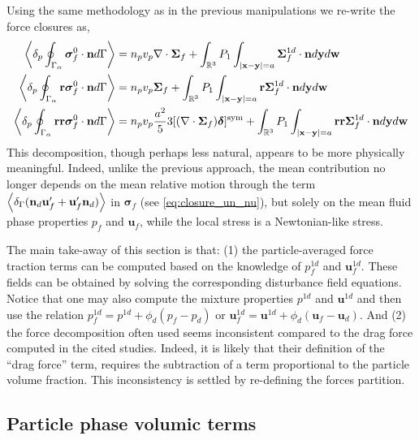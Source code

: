 Using the same methodology as in the previous manipulations we re-write the force closures as, 
\begin{align}
    \pSavg{\bm\sigma_f^0\cdot\textbf{n}}
    &=
    n_p v_p 
    \div\bm\Sigma_f
    +
    \int_{\mathbb{R}^3}
    P_1
    \int_{|\textbf{x}-\textbf{y}|=a}
    \bm\Sigma_f^{1d} \cdot \textbf{n}
    d\textbf{y}d\textbf{w}
    \label{eq:drag_final2}\\
    \pSavg{\textbf{r}\bm\sigma_f^0\cdot\textbf{n}}
    &=
    n_p v_p \bm\Sigma_f
    +
    \int_{\mathbb{R}^3}
    P_1
    \int_{|\textbf{x}-\textbf{y}|=a}
    \textbf{r}\bm\Sigma_f^{1d} \cdot \textbf{n}
    d\textbf{y}
    d\textbf{w}
    \\
    \pSavg{\textbf{rr}\bm\sigma_f^0\cdot\textbf{n}}
    &=
    n_pv_p  \frac{a^2}{5} 3 [(\div \bm\Sigma_f)\bm\delta]^\text{sym}
    +
    \int_{\mathbb{R}^3}
    P_1
    \int_{|\textbf{x}-\textbf{y}|=a}
    \textbf{rr}\bm\Sigma_f^{1d} \cdot \textbf{n}
    d\textbf{y}
    d\textbf{w}
    \label{eq:second_mom_general2}
\end{align}
This decomposition, though perhaps less natural, appears to be more physically meaningful. 
Indeed, unlike the previous approach, the mean contribution no longer depends on the mean relative motion through the term $\left<\delta_\Gamma (\textbf{n}_d \textbf{u}_f'+  \textbf{u}_f' \textbf{n}_d)\right>$ in $\bm\sigma_f$ (see \ref{eq:closure_un_nu}), but solely on the mean fluid phase properties $p_f$ and $\textbf{u}_f$, while the local stress is a Newtonian-like stress.  

The main take-away of this section is that: (1)  the particle-averaged force traction terms can be computed based on the knowledge of $p_f^{1d}$ and $\textbf{u}_f^{1d}$. 
These fields can be obtained by solving the corresponding disturbance field equations. 
Notice that one may also compute the mixture properties $p^{1d}$ and $\textbf{u}^{1d}$ and then use the relation $p_f^{1d} = p^{1d} + \phi_d (p_f - p_d)$ or $\textbf{u}_f^{1d} = \textbf{u}^{1d} + \phi_d (\textbf{u}_f - \textbf{u}_d)$. 
And (2) the force decomposition often used \citep{jackson2000,zhang1997momentum,wang2021numerical,wang2024effect} seems inconsistent compared to the drag force computed in the cited studies.
Indeed, it is likely that their definition of the ``drag force'' term, requires the subtraction of a term proportional to the particle volume fraction. 
This inconsistency is settled by re-defining the forces partition.  

\subsection{Particle phase volumic terms}

